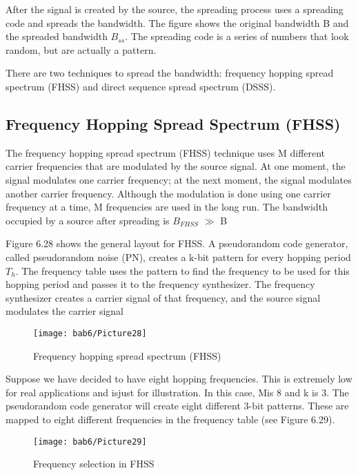 After the signal is created by the source, the spreading process uses a spreading code and spreads the bandwidth. The figure shows the original bandwidth B and the spreaded bandwidth $B_{ss}$. The spreading code is a series of numbers that look random, but are actually a pattern.

There are two techniques to spread the bandwidth: frequency hopping spread spectrum (FHSS) and direct sequence spread spectrum (DSSS).


\subsection{Frequency Hopping Spread Spectrum (FHSS)}
The frequency hopping spread spectrum (FHSS) technique uses M different carrier frequencies that are modulated by the source signal. At one moment, the signal modulates one carrier frequency; at the next moment, the signal modulates another carrier frequency. Although the modulation is done using one carrier frequency at a time, M frequencies are used in the long run. The bandwidth occupied by a source after spreading is $B_{FHSS}$ $\gg$ B

Figure 6.28 shows the general layout for FHSS. A pseudorandom code generator, called pseudorandom noise (PN), creates a k-bit pattern for every hopping period $T_h$. The frequency table uses the pattern to find the frequency to be used for this hopping period and passes it to the frequency synthesizer. The frequency synthesizer creates a carrier signal of that frequency, and the source signal modulates the carrier signal

\begin{figure}[htbp]
  \centering
  \texttt{[image: bab6/Picture28]}
  \caption{Frequency hopping spread spectrum (FHSS)}
  \label{fig6:27}
\end{figure}

Suppose we have decided to have eight hopping frequencies. This is extremely low for real applications and isjust for illustration. In this case, Mis 8 and k is 3. The pseudorandom code generator will create eight different 3-bit patterns. These are mapped to eight different frequencies in the frequency table (see Figure 6.29).

\begin{figure}[htbp]
  \centering
  \texttt{[image: bab6/Picture29]}
  \caption{Frequency selection in FHSS}
  \label{fig6:28}
\end{figure}

